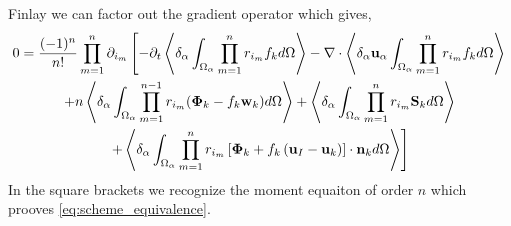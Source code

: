 Finlay we can factor out the gradient operator which gives, 
\begin{multline*}
    0 = \frac{(-1)^n}{n!}
    \prod_{m=1}^{n} \partial_{i_m}
    \left[
        - \partial_t
        \left<\delta_\alpha \int_{\Omega_\alpha} \prod_{m=1}^{n} r_{i_m}f_k d\Omega\right>
        - \mathbf{\nabla}\cdot \left<\delta_\alpha \textbf{u}_\alpha \int_{\Omega_\alpha} \prod_{m=1}^{n} r_{i_m}f_k d\Omega\right>
    \right.\\\left.
        +n\left<\delta_\alpha \int_{\Omega_\alpha} \prod_{m=1}^{n-1} r_{i_m} (\mathbf{\Phi}_k - f_k \textbf{w}_k) d\Omega\right>
        +\left<\delta_\alpha \int_{\Omega_\alpha} \prod_{m=1}^{n} r_{i_m} \textbf{S}_k d\Omega\right>
        \right.\\\left.
        +\left<\delta_\alpha \int_{\Omega_\alpha} \prod_{m=1}^{n} r_{i_m} \left[
            \mathbf{\Phi}_k
            + f_k
            \left(
                \textbf{u}_I
                - \textbf{u}_k
            \right)
        \right]
        \cdot \textbf{n}_kd\Omega\right>
    \right]
\end{multline*}
In the square brackets we recognize the moment equaiton of order $n$ which prooves \ref{eq:scheme_equivalence}.